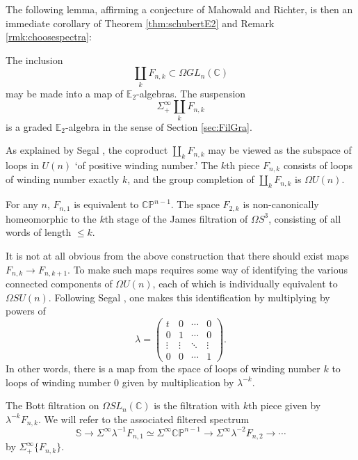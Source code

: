 The following lemma, affirming a conjecture of Mahowald and Richter, is then an immediate corollary of Theorem \ref{thm:schubertE2} and Remark \ref{rmk:choosespectra}:

\begin{lem}  
The inclusion 
$$\coprod_k F_{n,k} \subset \Omega GL_n(\mathbb{C})$$
may be made into a map of $\mathbb{E}_2$-algebras.  The suspension $$\Sigma^{\infty}_+ \coprod_k F_{n,k}$$ is a graded $\mathbb{E}_2$-algebra in the sense of Section \ref{sec:FilGra}.
\end{lem}

As explained by Segal \cite{Segal}, the coproduct $\coprod_k F_{n,k}$ may be viewed as the subspace of loops in $U(n)$ `of positive winding number.'  The $k$th piece $F_{n,k}$ consists of loops of winding number exactly $k$, and the group completion of $\coprod_k F_{n,k}$ is $\Omega U(n)$.

\begin{exm}
For any $n$, $F_{n,1}$ is equivalent to $\mathbb{CP}^{n-1}$.  The space $F_{2,k}$ is non-canonically homeomorphic to the $k$th stage of the James filtration of $\Omega S^3$, consisting of all words of length $\le k$.
\end{exm}

It is not at all obvious from the above construction that there should exist maps $F_{n,k} \rightarrow F_{n,k+1}$.  To make such maps requires some way of identifying the various connected components of $\Omega U(n)$, each of which is individually equivalent to $\Omega SU(n)$.  Following Segal \cite[pg. 3--4]{Segal}, one makes this identification by multiplying by powers of 
$$\lambda = \left( \begin{array}{cccc} t & 0 & \cdots & 0 \\ 0 & 1 & \cdots & 0 \\ \vdots & \vdots & \ddots & \vdots \\ 0 & 0 & \cdots & 1 \end{array} \right).$$
In other words, there is a map from the space of loops of winding number $k$ to loops of winding number $0$ given by multiplication by $\lambda^{-k}$.

\begin{dfn}
The Bott filtration on $\Omega SL_n(\mathbb{C})$ is the filtration with $k$th piece given by $\lambda^{-k} F_{n,k}$.  We will refer to the associated filtered spectrum 
$$\mathbb{S} \rightarrow \Sigma^{\infty} \lambda^{-1} F_{n,1} \simeq \Sigma^{\infty} \mathbb{CP}^{n-1} \rightarrow \Sigma^{\infty} \lambda^{-2} F_{n,2} \rightarrow \cdots$$
by $\Sigma^{\infty}_+ \{F_{n,k}\}$.
\end{dfn}


